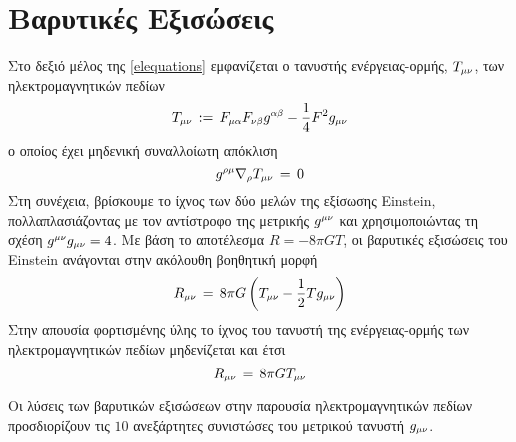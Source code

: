 \section{Βαρυτικές Εξισώσεις}
Στο δεξιό μέλος της \eqref{elequations} εμφανίζεται ο τανυστής ενέργειας-ορμής, $T\subscr{\mu\nu}$, των ηλεκτρομαγνητικών πεδίων 
\begin{equation}\label{energy_mom_tensor}
    T\subscr{\mu\nu} \,:=\, F\subscr{\mu\alpha} F\subscr{\nu\beta}\g[i]{\alpha}{\beta} - \frac{1}{4}F^2 \g{\mu}{\nu}
\end{equation}
ο οποίος έχει μηδενική συναλλοίωτη απόκλιση
\begin{equation*}
    \g[i]{\rho}{\mu}\nabla\subscr{\rho}T\subscr{\mu\nu} \,=\, 0
\end{equation*}
Στη συνέχεια, βρίσκουμε το ίχνος των δύο μελών της εξίσωσης Einstein, πολλαπλασιάζοντας με τον αντίστροφο της μετρικής $\g[i]{\mu}{\nu}$ και χρησιμοποιώντας τη σχέση $\g[i]{\mu}{\nu}\g{\mu}{\nu}=4$. Με βάση το αποτέλεσμα $R=-8\pi G T$, οι βαρυτικές εξισώσεις του Einstein ανάγονται στην ακόλουθη βοηθητική μορφή
\begin{equation}\label{einstein equations}
    \R{\mu}{\nu} \,=\, 8\pi G\left( T\subscr{\mu\nu} -\frac{1}{2}T\g{\mu}{\nu} \right)
\end{equation}
Στην απουσία φορτισμένης ύλης το ίχνος του τανυστή της ενέργειας-ορμής των ηλεκτρομαγνητικών πεδίων μηδενίζεται και έτσι
\begin{equation}
    \R{\mu}{\nu} \,=\, 8\pi G T\subscr{\mu\nu} 
\end{equation}

Οι λύσεις των βαρυτικών εξισώσεων στην παρουσία ηλεκτρομαγνητικών πεδίων προσδιορίζουν τις $10$ ανεξάρτητες συνιστώσες του μετρικού τανυστή $\g{\mu}{\nu}$.


